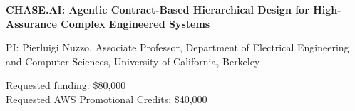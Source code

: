 {\raggedright
{}
\fontsize{13}{16}\selectfont\bfseries CHASE.AI: Agentic Contract-Based 
Hierarchical Design for High-Assurance Complex Engineered Systems
\par
}
\vspace{6pt}

PI: Pierluigi Nuzzo, Associate Professor, Department of Electrical Engineering and Computer Sciences, University of California, Berkeley

Requested funding: \$80,000\\
Requested AWS Promotional Credits: \$40,000

\par